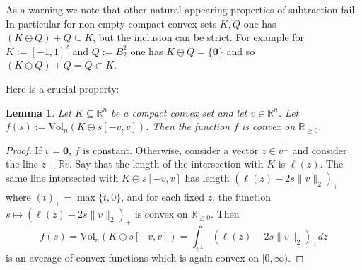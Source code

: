 \documentclass[12pt,english]{article}
\theoremstyle{theorem}
\newtheorem{lemma}[theorem]{Lemma}
\theoremstyle{remark}
\providecommand{\setR}{\mathbb{R}}
\newcommand{\Vol}{\mathrm{Vol}}
\begin{document}
As a warning we note that other natural appearing properties of subtraction fail. In particular for non-empty compact convex sets $K,Q$ one has $(K \ominus Q) + Q \subseteq K$, but the inclusion can be strict. For
example for $K := [-1,1]^2$ and $Q := B_2^2$ one has $K \ominus Q = \{ \bm{0} \}$ and so $(K \ominus Q) + Q = Q \subset K$.

Here is a crucial property:
\begin{lemma} \label{lem:VolumeOfSubtractionIsConvexInS}
Let $K \subseteq \setR^n$ be a compact convex set and let $v \in \setR^n$. Let $f(s) := \Vol_n(K \ominus s[-v,v])$. Then the function $f$ is convex on $\setR_{\ge 0}$. 
\end{lemma}
\begin{proof}
  If $v=\bm{0}$, $f$ is constant. Otherwise, consider a vector $z \in v^{\perp}$
  and consider the line $z + \setR v$. Say that the length of the intersection with $K$ is $\ell(z)$. The same line intersected with $K \ominus s [-v,v]$
  has length $(\ell(z) - 2s\|v\|_2)_+$ where $(t)_+ = \max\{ t,0\}$, and for each fixed $z$, the function $s \mapsto (\ell(z)-2s\|v\|_2)_+$ is convex on $\setR_{\ge 0}$.
  Then
  \[
 f(s) = \Vol_n(K \ominus s[-v,v]) = \int_{v^{\perp}} (\ell(z)-2s\|v\|_2)_+ dz
\]
is an average of convex functions which is again convex on $[0,\infty)$.
\end{proof}
\end{document}
